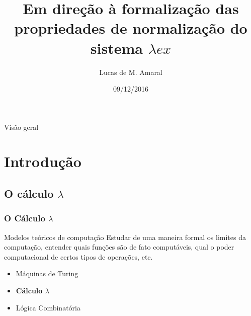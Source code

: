 \documentclass{beamer}
\title[Normalização no sistema $\lambda$ex]{Em direção à formalização das propriedades de normalização do sistema
    $\lambda ex$}
\author{
Lucas de M. Amaral
}
\institute[UnB]{Universidade de Brasilia}
\date{09/12/2016}
\begin{document}


\begin{frame}
\titlepage
\end{frame}

\begin{frame}{Visão geral}
\tableofcontents
\end{frame}

\section{Introdução}


\subsection{O cálculo $\lambda$}



\begin{frame}
\frametitle{O Cálculo $\lambda$}
\begin{block}{Modelos teóricos de computação}
Estudar de uma maneira formal os limites da computação, entender quais funções são de fato computáveis, qual o poder computacional de certos tipos de operações, etc.
\end{block}
\begin{itemize}
\item Máquinas de Turing
\item \textbf{Cálculo $\lambda$}
\item Lógica Combinatória
\end{itemize}
\end{frame}

\end{document}
